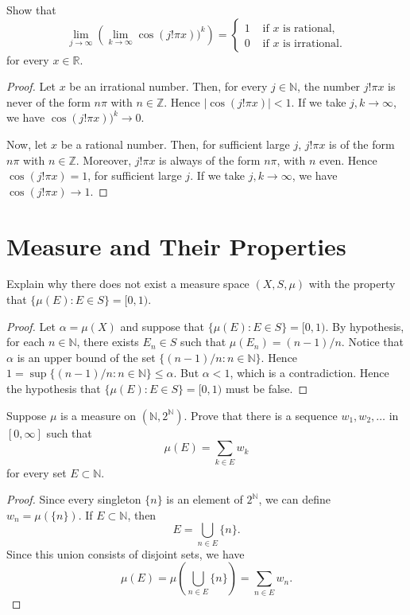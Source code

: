 \documentclass[14.5pt]{article}
\newcommand{\N}{\mathbb{N}}
\newcommand{\Z}{\mathbb{Z}}
\newcommand{\R}{\mathbb{R}}
\newenvironment{problem}[2][Problem]{\begin{mdframed}[backgroundcolor=gray!10, leftline = false, rightline=false, linewidth=0.25pt]  \begin{trivlist}
\item[\hskip \labelsep {\bfseries #1}\hskip \labelsep {\bfseries #2.}]}{\end{trivlist} \end{mdframed}  }
\begin{document}
\begin{problem}{2B.30}
Show that 
$$\lim_{j \to \infty} \left( \lim_{k \to \infty} \cos(j! \pi x))^k \right) = \begin{cases}
    1 & \text{ if } x \text{ is rational,}\\
    0 & \text{ if } x \text{ is irrational.}
\end{cases}$$
for every $x \in \R.$
\end{problem}
\begin{proof}
    Let $x$ be an irrational number. Then, for every $j \in \N$, the number $j! \pi x$ is never of the form $n \pi$ with $n \in \Z$. Hence $| \cos(j! \pi x) | < 1.$ If we take $j,k \to \infty$, we have $\cos(j! \pi x))^k \to 0$. 
    
    Now, let $x$ be a rational number. Then, for sufficient large $j$, $j! \pi x$ is of the form $n \pi$ with $n \in \Z$. Moreover,  $j! \pi x$ is always of the form $n \pi$, with $n$ even. Hence $\cos(j! \pi x) = 1$, for sufficient large $j.$ If we take $j,k \to \infty$, we have $\cos(j! \pi x) \to 1$.
\end{proof}




\section*{Measure and Their Properties}

\begin{problem}{2C.1} Explain why there does not exist a measure space $(X, S, \mu)$ with the property that $\{\mu(E) : E \in S\} = [0,1).$
\end{problem}
\begin{proof}
    Let $\alpha = \mu(X)$ and suppose that $\{\mu(E) : E \in S\} = [0,1).$ By hypothesis, for each $n\in \N$, there exists $E_n \in S$ such that $\mu(E_n) = (n-1) / n$. Notice that $\alpha$ is an upper bound of the set $\{(n-1) / n : n \in \N\}$. Hence $1 = \sup \{(n-1) / n : n \in \N\} \leq \alpha.$ But $\alpha < 1$, which is a contradiction. Hence the hypothesis that $\{\mu(E) : E \in S\} = [0,1)$ must be false.
\end{proof}

\begin{problem}{2C.2} Suppose $\mu$ is a measure on $(\N, 2^\N)$. Prove that there is a sequence $w_1, w_2, \ldots$ in $[0, \infty]$ such that 
$$\mu(E) = \sum_{k \in E} w_k$$
for every set $E\subset \N.$
\end{problem}
\begin{proof}
    Since every singleton $\{n\}$ is an element of $2^\N$, we can define $w_n = \mu(\{n\}).$ If $E \subset \N$, then 
    $$E = \bigcup_{n \in E} \{n\}.$$
    Since this union consists of disjoint sets, we have
    $$\mu(E) = \mu \left( \bigcup_{n\in E} \{n\} \right) = \sum_{n \in E } w_n. $$
\end{proof}
\end{document}
